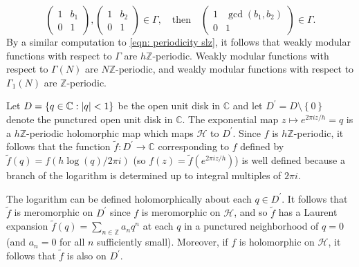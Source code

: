 \documentclass[10pt,leqno,twoside]{article}
\theoremstyle{plain}
\theoremstyle{definition}
\numberwithin{equation}{section}
\numberwithin{lem}{section}
\newcommand{\cbr}[1]{\left\{#1\right\}}
\begin{document}
\[\begin{pmatrix}
    1 & b_1 \\ 0 & 1
\end{pmatrix},\begin{pmatrix}
    1 & b_2 \\ 0 & 1
\end{pmatrix}\in\varGamma, \quad \text{then}\quad \begin{pmatrix}
    1 & \gcd(b_1,b_2) \\ 0 & 1
\end{pmatrix}\in \varGamma.\]
By a similar computation to \cref{eqn: periodicity slz}, it follows that weakly modular functions with respect to $\varGamma$ are $h\mathbb Z$-periodic. Weakly modular functions with respect to $\varGamma(N)$ are $N\mathbb{Z}$-periodic, and weakly modular functions with respect to $\varGamma_1(N)$ are $\mathbb Z$-periodic.

Let $D = \cbr{q\in\mathbb C : \abs{q} <1}$ be the open unit disk in $\mathbb C$ and let $D^\prime = D \setminus \!\cbr{0}$ denote the punctured open unit disk in $\mathbb C$. The exponential map $z\mapsto e^{2\pi i z/h} = q$ is a $h\mathbb{Z}$-periodic holomorphic map which maps $\mathcal H$ to $D^\prime$. Since $f$ is $h\mathbb{Z}$-periodic, it follows that the function $\tilde f\colon D^\prime\to\mathbb C$ corresponding to $f$ defined by $\tilde f(q) = f(h\log (q)/2\pi i)$ (so $f(z) = \tilde f(e^{2\pi i z/h})$) is well defined because a branch of the logarithm is determined up to integral multiples of $2\pi i$.

The logarithm can be defined holomorphically about each $q\in D^\prime$. It follows that $\tilde f$ is meromorphic on $D^\prime$ since $f$ is meromorphic on $\mathcal H$, and so $\tilde f$ has a Laurent expansion $\tilde f(q) = \sum_{n\in\mathbb Z}a_nq^n$ at each $q$ in a punctured neighborhood of $q=0$ (and $a_n = 0$ for all $n$ sufficiently small). Moreover, if $f$ is holomorphic on $\mathcal H$, it follows that $\tilde f$ is also on $D^\prime$.
\end{document}
